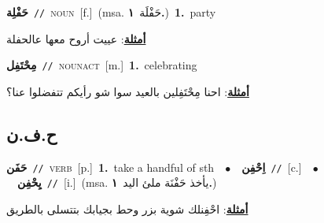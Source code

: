 \documentclass[10pt,a4paper,twoside]{article} %
\begin{document}
\begin{multicols}{2}
{\setlength\topsep{0pt}\textbf{\foreignlanguage{arabic}{حَفْلِة}}\ {\color{gray}\texttt{//}\color{black}}\ \textsc{noun}\ [f.]\ \color{gray}(msa. \foreignlanguage{arabic}{حَفْلَة}~\foreignlanguage{arabic}{\textbf{١.}})\color{black}\ \textbf{1.}~party\  \begin{flushright}\color{gray}\foreignlanguage{arabic}{\textbf{\underline{\foreignlanguage{arabic}{أمثلة}}}: عييت أروح معها عالحفلة}\end{flushright}\color{black}} \vspace{2mm}

{\setlength\topsep{0pt}\textbf{\foreignlanguage{arabic}{مِحْتَفِل}}\ {\color{gray}\texttt{//}\color{black}}\ \textsc{noun\textunderscore act}\ [m.]\ \textbf{1.}~celebrating\  \begin{flushright}\color{gray}\foreignlanguage{arabic}{\textbf{\underline{\foreignlanguage{arabic}{أمثلة}}}: احنا مِحْتَفِلين بالعيد سوا شو رأيكم تتفضلوا عنا؟}\end{flushright}\color{black}} \vspace{2mm}

\vspace{-3mm}
\subsection*{\color{blue}\foreignlanguage{arabic}{ح.ف.ن}\color{blue}{}} 

{\setlength\topsep{0pt}\textbf{\foreignlanguage{arabic}{حَفَن}}\ {\color{gray}\texttt{//}\color{black}}\ \textsc{verb}\ [p.]\ \textbf{1.}~take a handful of sth\ \ $\bullet$\ \ \setlength\topsep{0pt}\textbf{\foreignlanguage{arabic}{اِحْفِن}}\ {\color{gray}\texttt{//}\color{black}}\ [c.]\ \ $\bullet$\ \ \setlength\topsep{0pt}\textbf{\foreignlanguage{arabic}{يِحْفِن}}\ {\color{gray}\texttt{//}\color{black}}\ [i.]\ \color{gray}(msa. \foreignlanguage{arabic}{يأخذ حَفْنَة ملئ اليد}~\foreignlanguage{arabic}{\textbf{١.}})\color{black}\  \begin{flushright}\color{gray}\foreignlanguage{arabic}{\textbf{\underline{\foreignlanguage{arabic}{أمثلة}}}: احْفِنلك شوية بزر وحط بجيابك  بتتسلى بالطريق}\end{flushright}\color{black}} \vspace{2mm}


\end{multicols}
\end{document}
